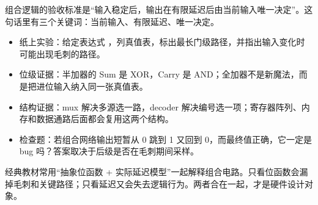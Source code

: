 \begin{classicnote}
组合逻辑的验收标准是“输入稳定后，输出在有限延迟后由当前输入唯一决定”。这句话里有三个关键词：当前输入、有限延迟、唯一决定。

\begin{itemize}
\item 纸上实验：给定表达式 ，列真值表，标出最长门级路径，并指出输入变化时可能出现毛刺的路径。
\item 位级证据：半加器的 Sum 是 XOR，Carry 是 AND；全加器不是新魔法，而是把进位输入纳入同一张真值表。
\item 结构证据：mux 解决多源选一路，decoder 解决编号选一项；寄存器阵列、内存和数据通路后面都会复用这两个结构。
\item 检查题：若组合网络输出短暂从 0 跳到 1 又回到 0，而最终值正确，它一定是 bug 吗？答案取决于后级是否在毛刺期间采样。
\end{itemize}

经典教材常用“抽象位函数 + 实际延迟模型”一起解释组合电路。只看位函数会漏掉毛刺和关键路径；只看延迟又会失去逻辑行为。两者合在一起，才是硬件设计对象。
\end{classicnote}
